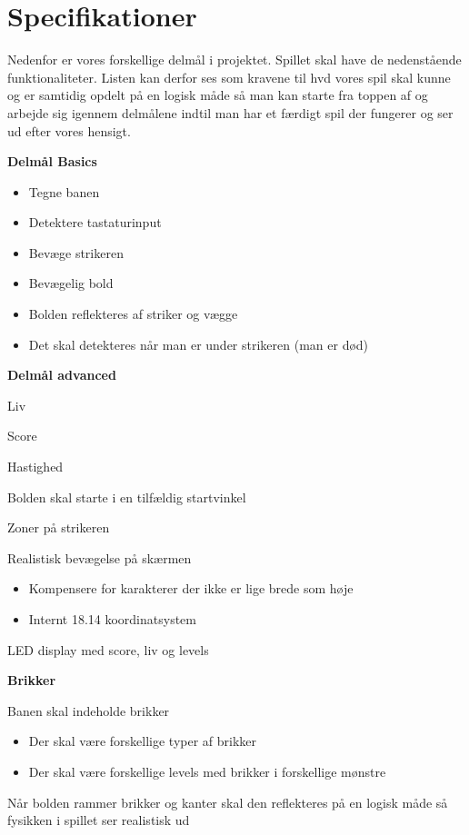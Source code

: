 \chapter{Specifikationer}

Nedenfor er vores forskellige delmål i projektet. Spillet skal have de nedenstående funktionaliteter. Listen kan derfor ses som kravene til hvd vores spil skal kunne og er samtidig opdelt på en logisk måde så man kan starte fra toppen af og arbejde sig igennem delmålene indtil man har et færdigt spil der fungerer og ser ud efter vores hensigt. 

\textbf{Delmål Basics}
\begin{itemize}
\item Tegne banen
\item Detektere tastaturinput
\item Bevæge strikeren
\item Bevægelig bold
\item Bolden reflekteres af striker og vægge
\item Det skal detekteres når man er under strikeren (man er død)
\end{itemize}

\textbf{Delmål advanced}
\item Liv
\item Score
\item Hastighed
\item Bolden skal starte i en tilfældig startvinkel
\item Zoner på strikeren
\item Realistisk bevægelse på skærmen
\begin{itemize}
	\item Kompensere for karakterer der ikke er lige brede som høje
	\item Internt 18.14 koordinatsystem
\end{itemize}
\item LED display med score, liv og levels
	

\textbf{Brikker}
\item Banen skal indeholde brikker
\begin{itemize}
	\item Der skal være forskellige typer af brikker
	\item Der skal være forskellige levels med brikker i forskellige mønstre
\end{itemize}
\item Når bolden rammer brikker og kanter skal den reflekteres på en logisk måde så fysikken i spillet ser realistisk ud


